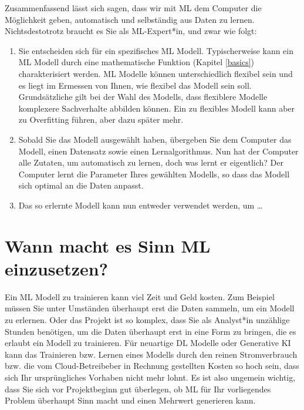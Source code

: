 \documentclass[
]{book}
\providecommand{\tightlist}{%
  \setlength{\itemsep}{0pt}\setlength{\parskip}{0pt}}
\begin{document}
Zusammenfassend lässt sich sagen, dass wir mit ML dem Computer die Möglichkeit geben, automatisch und selbständig aus Daten zu lernen. Nichtsdestotrotz braucht es Sie als ML-Expert*in, und zwar wie folgt:

\begin{enumerate}
\def\labelenumi{\arabic{enumi}.}
\tightlist
\item
  Sie entscheiden sich für ein spezifisches ML Modell. Typischerweise kann ein ML Modell durch eine mathematische Funktion (Kapitel \ref{basics}) charakterisiert werden. ML Modelle können unterschiedlich flexibel sein und es liegt im Ermessen von Ihnen, wie flexibel das Modell sein soll. Grundsätzliche gilt bei der Wahl des Modells, dass flexiblere Modelle komplexere Sachverhalte abbilden können. Ein zu flexibles Modell kann aber zu Overfitting führen, aber dazu später mehr.
\item
  Sobald Sie das Modell ausgewählt haben, übergeben Sie dem Computer das Modell, einen Datensatz sowie einen Lernalgorithmus. Nun hat der Computer alle Zutaten, um automatisch zu lernen, doch was lernt er eigentlich? Der Computer lernt die Parameter Ihres gewählten Modells, so dass das Modell sich optimal an die Daten anpasst.
\item
  Das so erlernte Modell kann nun entweder verwendet werden, um \ldots{}
\end{enumerate}

\hypertarget{wann-macht-es-sinn-ml-einzusetzen}{%
\section{Wann macht es Sinn ML einzusetzen?}\label{wann-macht-es-sinn-ml-einzusetzen}}

Ein ML Modell zu trainieren kann viel Zeit und Geld kosten. Zum Beispiel müssen Sie unter Umständen überhaupt erst die Daten sammeln, um ein Modell zu erlernen. Oder das Projekt ist so komplex, dass Sie als Analyst*in unzählige Stunden benötigen, um die Daten überhaupt erst in eine Form zu bringen, die es erlaubt ein Modell zu trainieren. Für neuartige DL Modelle oder Generative KI kann das Trainieren bzw. Lernen eines Modells durch den reinen Stromverbrauch bzw. die vom Cloud-Betreibeber in Rechnung gestellten Kosten so hoch sein, dass sich Ihr ursprüngliches Vorhaben nicht mehr lohnt. Es ist also ungemein wichtig, dass Sie sich vor Projektbeginn gut überlegen, ob ML für Ihr vorliegendes Problem überhaupt Sinn macht und einen Mehrwert generieren kann.
\end{document}
